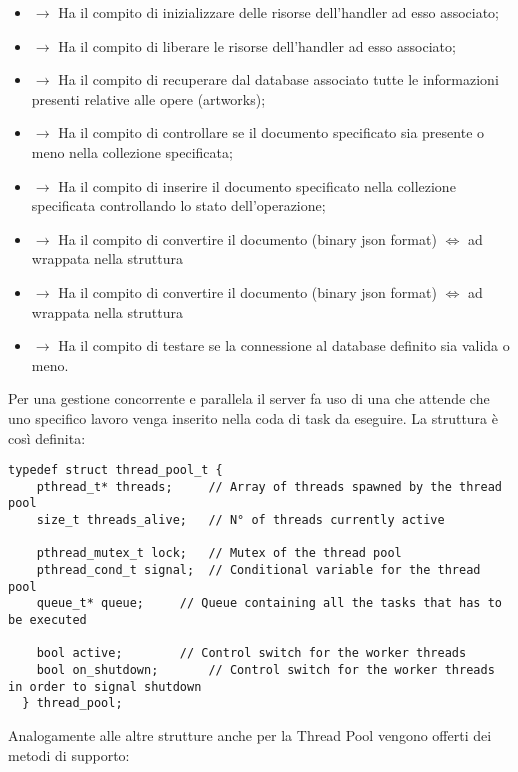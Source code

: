   \begin{itemize}
    \item {} $\rightarrow$ Ha il compito di inizializzare delle risorse dell'handler ad esso associato;
    \item {} $\rightarrow$ Ha il compito di liberare le risorse dell'handler ad esso associato;
    \item {} $\rightarrow$ Ha il compito di recuperare dal database associato tutte le informazioni presenti relative alle opere (artworks);
    \item {} $\rightarrow$ Ha il compito di controllare se il documento specificato sia presente o meno nella collezione specificata;
    \item {} $\rightarrow$ Ha il compito di inserire il documento specificato nella collezione specificata controllando lo stato dell'operazione;
    \item {} $\rightarrow$ Ha il compito di convertire il documento  (binary json format) $\Longleftrightarrow$ ad  wrappata nella struttura 
    \item {} $\rightarrow$ Ha il compito di convertire il documento  (binary json format) $\Longleftrightarrow$ ad  wrappata nella struttura 
    \item {} $\rightarrow$ Ha il compito di testare se la connessione al database definito sia valida o meno.
  \end{itemize}

  \begin{center}  \end{center}
  Per una gestione concorrente e parallela il server fa uso di una \href{https://it.wikipedia.org/wiki/Thread_pool}{} che attende che uno specifico lavoro venga inserito nella coda di task da eseguire. La struttura è così definita:

  \begin{lstlisting}[language={[POSIX]C}, style=wnumbers]
  typedef struct thread_pool_t {
    pthread_t* threads;		// Array of threads spawned by the thread pool
    size_t threads_alive;	// N° of threads currently active

    pthread_mutex_t lock;	// Mutex of the thread pool
    pthread_cond_t signal;	// Conditional variable for the thread pool
    queue_t* queue;		// Queue containing all the tasks that has to be executed

    bool active;		// Control switch for the worker threads
    bool on_shutdown;		// Control switch for the worker threads in order to signal shutdown
  } thread_pool;
  \end{lstlisting}
  Analogamente alle altre strutture anche per la Thread Pool vengono offerti dei metodi di supporto:

